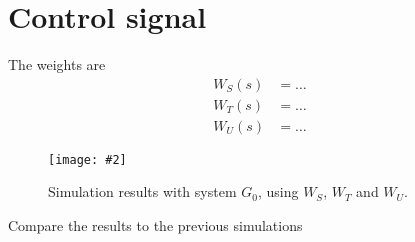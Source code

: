 \documentclass[a4paper,11pt]{article}
\newcommand{\image}[3][width=1.0\columnwidth]{
	\begin{figure}[h!]
		\centering
	    \texttt{[image: \#2]}
		\caption{#3}
		\label{fig:#2}
	\end{figure}
}
\begin{document}
	\section*{Control signal}

	The weights are
	\begin{align*}
		W_S(s) &= \ldots\\
		W_T(s) &= \ldots\\
		W_U(s) &= \ldots
	\end{align*}

	\image{figure_4.pdf}{Simulation results with system $G_0$, using $W_S$, $W_T$ and $W_U$.}

	Compare the results to the previous simulations
	\par\dotfill\par\dotfill\par
\end{document}
